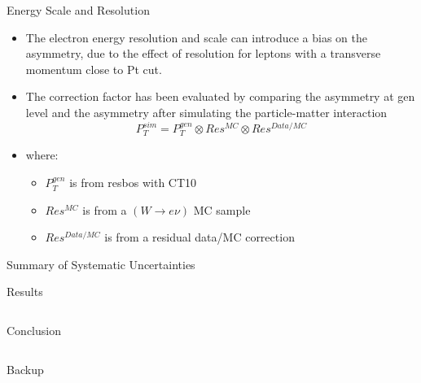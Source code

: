 \documentclass[t, 8pt]{beamer}
\begin{document}
\begin{frame}{Energy Scale and Resolution}
    \begin{itemize}
      \item The electron energy resolution and scale can introduce a bias on the asymmetry, due to the effect of resolution for leptons with a transverse momentum close to Pt cut.
      \item The correction factor has been evaluated by comparing the asymmetry at gen level and the asymmetry after simulating the particle-matter interaction
      \begin{equation}
      P_T^{sim} = P_T^{gen} \otimes Res^{MC} \otimes Res^{Data/MC}
      \end{equation}
      \item where:
      \begin{itemize} 
        \item $P_T^{gen}$ is from resbos with CT10
        \item $Res^{MC}$ is from a $(W\to e\nu)$ MC sample
        \item $Res^{Data/MC}$ is from a residual data/MC correction 
      \end{itemize}
    \end{itemize}
\end{frame}

\begin{frame}{Summary of Systematic Uncertainties}
\end{frame}

\begin{frame}{Results}
  \begin{columns}[c]
  \end{columns}
\end{frame}

\begin{frame}{Conclusion}
  \begin{columns}[c]
  \end{columns}
\end{frame}


\begin{frame}{Backup}
\end{frame}
\end{document}
